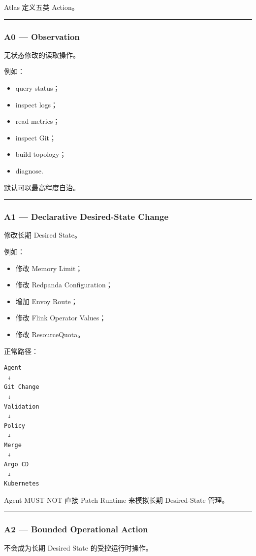 \documentclass[11pt,a4paper]{article}
\begin{document}
Atlas 定义五类 Action。

\vspace{0.5em}\hrule\vspace{0.5em}
\subsubsection{A0 — Observation}
无状态修改的读取操作。

例如：

\begin{itemize}
  \item query status；
  \item inspect logs；
  \item read metrics；
  \item inspect Git；
  \item build topology；
  \item diagnose.
\end{itemize}
默认可以最高程度自治。

\vspace{0.5em}\hrule\vspace{0.5em}
\subsubsection{A1 — Declarative Desired-State Change}
修改长期 Desired State。

例如：

\begin{itemize}
  \item 修改 Memory Limit；
  \item 修改 Redpanda Configuration；
  \item 增加 Envoy Route；
  \item 修改 Flink Operator Values；
  \item 修改 ResourceQuota。
\end{itemize}
正常路径：

\begin{lstlisting}[language=text]
Agent
 ↓
Git Change
 ↓
Validation
 ↓
Policy
 ↓
Merge
 ↓
Argo CD
 ↓
Kubernetes
\end{lstlisting}
Agent MUST NOT 直接 Patch Runtime 来模拟长期 Desired-State 管理。

\vspace{0.5em}\hrule\vspace{0.5em}
\subsubsection{A2 — Bounded Operational Action}
不会成为长期 Desired State 的受控运行时操作。
\end{document}
